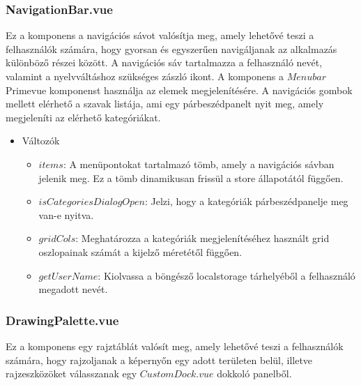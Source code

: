\subsubsection{NavigationBar.vue}
Ez a komponens a navigációs sávot valósítja meg, amely lehetővé teszi a felhasználók számára, hogy gyorsan és egyszerűen navigáljanak az alkalmazás különböző részei között. A navigációs sáv tartalmazza a felhasználó nevét, valamint a nyelvváltáshoz szükséges zászló ikont. A komponens a $Menubar$ Primevue komponenst használja az elemek megjelenítésére. A navigációs gombok mellett elérhető a szavak listája, ami egy párbeszédpanelt nyit meg, amely megjeleníti az elérhető kategóriákat.
\begin{itemize}
    \item Változók
    \begin{itemize}
        \item $items$: A menüpontokat tartalmazó tömb, amely a navigációs sávban jelenik meg. Ez a tömb dinamikusan frissül a store állapotától függően.
        \item $isCategoriesDialogOpen$: Jelzi, hogy a kategóriák párbeszédpanelje meg van-e nyitva.
        \item $gridCols$: Meghatározza a kategóriák megjelenítéséhez használt grid oszlopainak számát a kijelző méretétől függően.
        \item $getUserName$: Kiolvassa a böngésző localstorage tárhelyéből a felhasználó megadott nevét.
    \end{itemize}
\end{itemize}
\subsubsection{DrawingPalette.vue}
Ez a komponens egy rajztáblát valósít meg, amely lehetővé teszi a felhasználók számára, hogy rajzoljanak a képernyőn egy adott területen belül, illetve rajzeszközöket válasszanak egy $CustomDock.vue$ dokkoló panelből.


